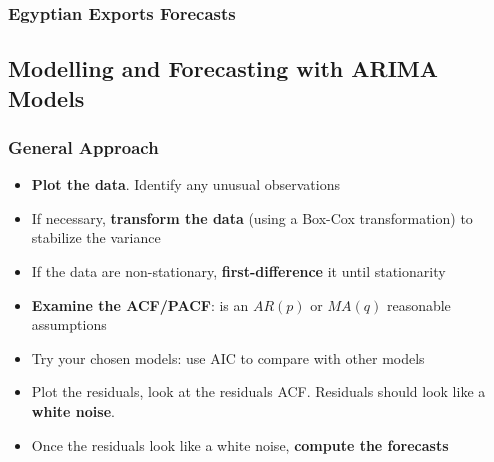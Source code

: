 \documentclass{beamer}
\begin{document}
\begin{frame}
  \frametitle{Egyptian Exports Forecasts}
\end{frame}


\subsection{Modelling and Forecasting with ARIMA Models}


\begin{frame}
  \frametitle{General Approach}
  \begin{itemize}
  \item \textbf{Plot the data}. Identify any unusual observations
  \item If necessary, \textbf{transform the data} (using a Box-Cox transformation) to stabilize the variance
  \item If the data are non-stationary, \textbf{first-difference} it until stationarity
  \item \textbf{Examine the ACF/PACF}: is an $AR(p)$ or $MA(q)$ reasonable assumptions
  \item Try your chosen models: use AIC to compare with other models
  \item Plot the residuals, look at the residuals ACF. Residuals should look like a \textbf{white noise}.
  \item Once the residuals look like a white noise, \textbf{compute the forecasts}    
  \end{itemize}
\end{frame}
\end{document}
